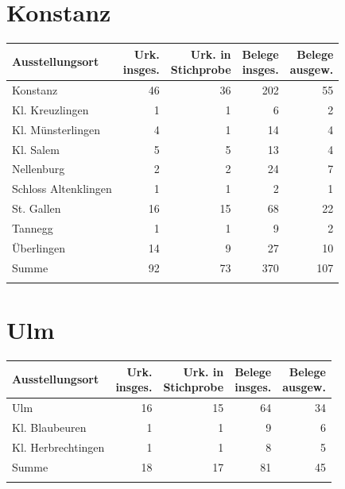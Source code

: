 \section{Konstanz}

\begin{tabularx}{\linewidth}{X r r r r}
\lsptoprule
Ausstellungsort
	& \makecell{Urk.\\ insges.}
	& \makecell{Urk. in\\ Stichprobe}
	& \makecell{Belege\\ insges.}
	& \makecell{Belege\\ ausgew.}
	\\
\midrule

Konstanz
	& 46
	& 36
	& 202
	& 55
	\\

Kl. Kreuzlingen
	& 1
	& 1
	& 6
	& 2
	\\

Kl. Münsterlingen
	& 4
	& 1
	& 14
	& 4
	\\

Kl. Salem
	& 5
	& 5
	& 13
	& 4
	\\

Nellenburg
	& 2
	& 2
	& 24
	& 7
	\\

Schloss Altenklingen
	& 1
	& 1
	& 2
	& 1
	\\

St. Gallen
	& 16
	& 15
	& 68
	& 22
	\\

Tannegg
	& 1
	& 1
	& 9
	& 2
	\\

Überlingen
	& 14
	& 9
	& 27
	& 10
	\\

\midrule

Summe
	& 92
	& 73
	& 370
	& 107
	\\

\lspbottomrule
\end{tabularx}

\section{Ulm}

\begin{tabularx}{\linewidth}{X r r r r}
\lsptoprule
Ausstellungsort
	& \makecell{Urk.\\ insges.}
	& \makecell{Urk. in\\ Stichprobe}
	& \makecell{Belege\\ insges.}
	& \makecell{Belege\\ ausgew.}
	\\
\midrule

Ulm
	& 16
	& 15
	& 64
	& 34
	\\

Kl. Blaubeuren
	& 1
	& 1
	& 9
	& 6
	\\

Kl. Herbrechtingen
	& 1
	& 1
	& 8
	& 5
	\\

\midrule

Summe
	& 18
	& 17
	& 81
	& 45
	\\

\lspbottomrule
\end{tabularx}

